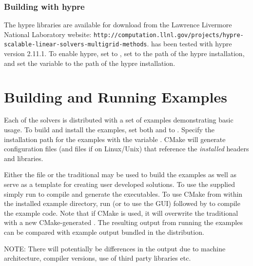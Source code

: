 \subsubsection*{Building with hypre}
The hypre libraries are available for download from the Lawrence Livermore
National Laboratory website:\newline
{\tt http://computation.llnl.gov/projects/hypre-scalable-linear-solvers-multigrid-methods}. 
{\sundials} has been tested with hypre version 2.11.1. 
To enable hypre, set   to , set 
to the  path of the hypre installation, and set the variable
 to the  path of the hypre installation.

\section{Building and Running Examples}
Each of the {\sundials} solvers is distributed with a set of examples demonstrating basic usage.
To build and install the examples, set both  and  to .
Specify the installation path for the examples with the variable . CMake will generate
 configuration files (and  files if on Linux/Unix) that reference the
{\em installed} {\sundials} headers and libraries.

Either the  file or the traditional  may be used to build the examples
as well as serve as a template for creating user developed solutions.
To use the supplied  simply run  to compile and generate the executables.
To use CMake from within the installed example directory, run  (or  to use the GUI)
followed by  to compile the example code.
Note that if CMake is used, it will overwrite the traditional  with a new CMake-generated .
The resulting output from running the examples can be compared with example output bundled
in the {\sundials} distribution.

\noindent NOTE: There will potentially be differences in the output due to machine architecture, compiler versions,
use of third party libraries etc.{\warn} 


